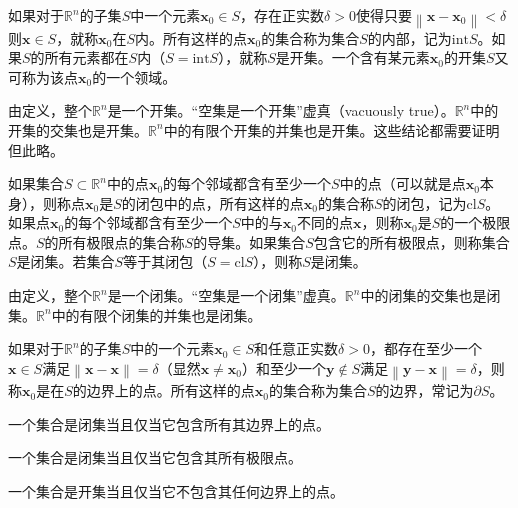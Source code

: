 \documentclass[main.tex]{subfiles}
\begin{document}
\begin{definition}[开集]
如果对于$\mathbb{R}^n$的子集$S$中一个元素$\mathbf{x}_0\in S$，存在正实数$\delta>0$使得只要$\left\|\mathbf{x}-\mathbf{x}_0\right\|<\delta$则$\mathbf{x}\in S$，就称$\mathbf{x}_0$在$S$内。所有这样的点$\mathbf{x}_0$的集合称为集合$S$的内部，记为$\mathrm{int}S$。如果$S$的所有元素都在$S$内（$S=\mathrm{int}S$），就称$S$是开集。一个含有某元素$\mathbf{x}_0$的开集$S$又可称为该点$\mathbf{x}_0$的一个领域。
\end{definition}

由定义，整个$\mathbb{R}^n$是一个开集。“空集是一个开集”虚真（vacuously true）。$\mathbb{R}^n$中的开集的交集也是开集。$\mathbb{R}^n$中的有限个开集的并集也是开集。这些结论都需要证明但此略。

\begin{definition}[闭集]
如果集合$S\subset\mathbb{R}^n$中的点$\mathbf{x}_0$的每个邻域都含有至少一个$S$中的点（可以就是点$\mathbf{x}_0$本身），则称点$\mathbf{x}_0$是$S$的闭包中的点，所有这样的点$\mathbf{x}_0$的集合称$S$的闭包，记为$\mathrm{cl}S$。如果点$\mathbf{x}_0$的每个邻域都含有至少一个$S$中的与$\mathbf{x}_0$不同的点$\mathbf{x}$，则称$\mathbf{x}_0$是$S$的一个极限点。$S$的所有极限点的集合称$S$的导集。如果集合$S$包含它的所有极限点，则称集合$S$是闭集。若集合$S$等于其闭包（$S=\mathrm{cl}S$），则称$S$是闭集。
\end{definition}

由定义，整个$\mathbb{R}^n$是一个闭集。“空集是一个闭集”虚真。$\mathbb{R}^n$中的闭集的交集也是闭集。$\mathbb{R}^n$中的有限个闭集的并集也是闭集。

\begin{definition}[边界]
如果对于$\mathbb{R}^n$的子集$S$中的一个元素$\mathbf{x}_0\in S$和任意正实数$\delta>0$，都存在至少一个$\mathbf{x}\in S$满足$\left\|\mathbf{x}-\mathbf{x}\right\|=\delta$（显然$\mathbf{x}\neq\mathbf{x}_0$）和至少一个$\mathbf{y}\notin S$满足$\left\|\mathbf{y}-\mathbf{x}\right\|=\delta$，则称$\mathbf{x}_0$是在$S$的边界上的点。所有这样的点$\mathbf{x}_0$的集合称为集合$S$的边界，常记为$\partial S$。
\end{definition}

\begin{theorem}
一个集合是闭集当且仅当它包含所有其边界上的点。
\end{theorem}

\begin{corollary}
一个集合是闭集当且仅当它包含其所有极限点。
\end{corollary}

\begin{corollary}
一个集合是开集当且仅当它不包含其任何边界上的点。
\end{corollary}
\end{document}
